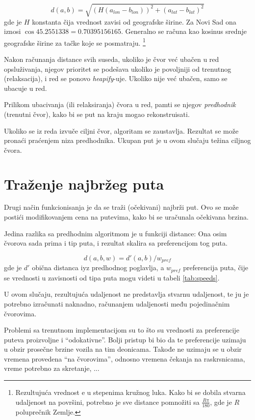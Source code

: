 \documentclass[a4paper]{article}
\begin{document}
\[
    d (a, b) = \sqrt{ ( H ( a_{lon} - b_{lon} ) ) ^ 2 + ( a_{lat} - b_{lat} ) ^ 2 }
\]
gde je $H$ konstanta čija vrednost zavisi od geografske širine. Za Novi Sad ona iznosi $ \cos 45.2551338 = 0.70395156165 $. Generalno se računa kao kosinus srednje geografske širine za tačke koje se posmatraju. \footnote{Rezultujuća vrednost e u stepenima kružnog luka. Kako bi se dobila stvarna udaljenost na površini, potrebno je sve distance pomnožiti sa $\frac{R \pi}{180}$, gde je $R$ poluprečnik Zemlje.}

Nakon računanja distance svih suseda, ukoliko je čvor već ubačen u red opsluživanja, njegov prioritet se podešava ukoliko je povoljniji od trenutnog (relaksacija), i red se ponovo \emph{heapify}-uje. Ukoliko nije već ubačen, samo se ubacuje u red.

Prilikom ubacivanja (ili relaksiranja) čvora u red, pamti se njegov \emph{predhodnik} (trenutni čvor), kako bi se put na kraju mogao rekonstruisati.

Ukoliko se iz reda izvuče ciljni čvor, algoritam se zaustavlja. Rezultat se može pronaći praćenjem niza predhodnika. Ukupan put je u ovom slučaju težina ciljnog čvora.

\section{Traženje najbržeg puta}

Drugi način funkcionisanja je da se traži (očekivani) najbrži put. Ovo se može postići modifikovanjem cena na putevima, kako bi se uračunala očekivana brzina.

Jedina razlika sa predhodnim algoritmom je u funkciji distance: Ona osim čvorova sada prima i tip puta, i rezultat skalira sa preferencijom tog puta.

\[
    d(a, b, w) = d'(a, b) / w_{pref}
\]
gde je $d'$ obična distanca iyz predhodnog poglavlja, a $w_{pref}$ preferencija puta, čije se vrednosti u zavisnosti od tipa puta mogu videti u tabeli \ref{tab:speeds}.

U ovom slučaju, rezultujuća udaljenost ne predstavlja stvarnu udaljenost, te ju je potrebno izračunati naknadno, računanjem udaljenosti među pojedinačnim čvorovima.

Problemi sa trenutnom implementacijom su to što su vrednosti za preferencije puteva proizvoljne i ``odokativne''. Bolji pristup bi bio da te preferencije uzimaju u obzir prosečne brzine vozila na tim deonicama. Takođe ne uzimaju se u obzir vremena provedena ``na čvorovima'', odnosno vremena čekanja na raskrsnicama, vreme potrebno za skretanje, ...
\end{document}
